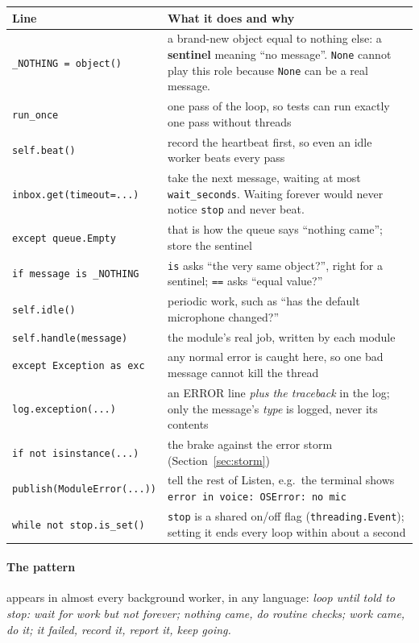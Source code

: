 \documentclass[11pt,a4paper]{article}
\begin{document}
\begin{center}
\renewcommand{\arraystretch}{1.15}
\begin{tabularx}{\textwidth}{l X}
\toprule
\textbf{Line} & \textbf{What it does and why} \\
\midrule
\texttt{\_NOTHING = object()} & a brand-new object equal to nothing else: a \textbf{sentinel} meaning ``no message''. \texttt{None} cannot play this role because \texttt{None} can be a real message. \\
\texttt{run\_once} & one pass of the loop, so tests can run exactly one pass without threads \\
\texttt{self.beat()} & record the heartbeat first, so even an idle worker beats every pass \\
\texttt{inbox.get(timeout=...)} & take the next message, waiting at most \texttt{wait\_seconds}. Waiting forever would never notice \texttt{stop} and never beat. \\
\texttt{except queue.Empty} & that is how the queue says ``nothing came''; store the sentinel \\
\texttt{if message is \_NOTHING} & \texttt{is} asks ``the very same object?'', right for a sentinel; \texttt{==} asks ``equal value?'' \\
\texttt{self.idle()} & periodic work, such as ``has the default microphone changed?'' \\
\texttt{self.handle(message)} & the module's real job, written by each module \\
\texttt{except Exception as exc} & any normal error is caught here, so one bad message cannot kill the thread \\
\texttt{log.exception(...)} & an ERROR line \emph{plus the traceback} in the log; only the message's \emph{type} is logged, never its contents \\
\texttt{if not isinstance(...)} & the brake against the error storm (Section~\ref{sec:storm}) \\
\texttt{publish(ModuleError(...))} & tell the rest of Listen, e.g.\ the terminal shows \texttt{error in voice: OSError: no mic} \\
\texttt{while not stop.is\_set()} & \texttt{stop} is a shared on/off flag (\texttt{threading.Event}); setting it ends every loop within about a second \\
\bottomrule
\end{tabularx}
\end{center}

\paragraph{The pattern} appears in almost every background worker, in any language:
\emph{loop until told to stop: wait for work but not forever; nothing came, do routine checks;
work came, do it; it failed, record it, report it, keep going.}
\end{document}
